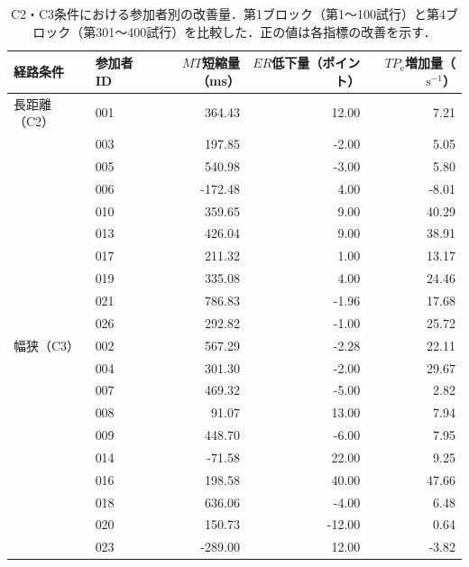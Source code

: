 \begin{table}[htbp]
  \centering
  \caption{C2・C3条件における参加者別の改善量．第1ブロック（第1～100試行）と第4ブロック（第301～400試行）を比較した．正の値は各指標の改善を示す．}
  \label{tab:practice-individual-changes}
  \small
  \begin{tabular}{llrrr}
    \hline
    経路条件 & 参加者ID & \(MT\)短縮量（ms） & \(ER\)低下量（ポイント） & \(TP_{\mathrm{e}}\)増加量（\(\mathrm{s}^{-1}\)） \\
    \hline
    長距離（C2） & 001 & 364.43 & 12.00 & 7.21 \\
     & 003 & 197.85 & -2.00 & 5.05 \\
     & 005 & 540.98 & -3.00 & 5.80 \\
     & 006 & -172.48 & 4.00 & -8.01 \\
     & 010 & 359.65 & 9.00 & 40.29 \\
     & 013 & 426.04 & 9.00 & 38.91 \\
     & 017 & 211.32 & 1.00 & 13.17 \\
     & 019 & 335.08 & 4.00 & 24.46 \\
     & 021 & 786.83 & -1.96 & 17.68 \\
     & 026 & 292.82 & -1.00 & 25.72 \\
    \hline
    幅狭（C3） & 002 & 567.29 & -2.28 & 22.11 \\
     & 004 & 301.30 & -2.00 & 29.67 \\
     & 007 & 469.32 & -5.00 & 2.82 \\
     & 008 & 91.07 & 13.00 & 7.94 \\
     & 009 & 448.70 & -6.00 & 7.95 \\
     & 014 & -71.58 & 22.00 & 9.25 \\
     & 016 & 198.58 & 40.00 & 47.66 \\
     & 018 & 636.06 & -4.00 & 6.48 \\
     & 020 & 150.73 & -12.00 & 0.64 \\
     & 023 & -289.00 & 12.00 & -3.82 \\
    \hline
  \end{tabular}
\end{table}
